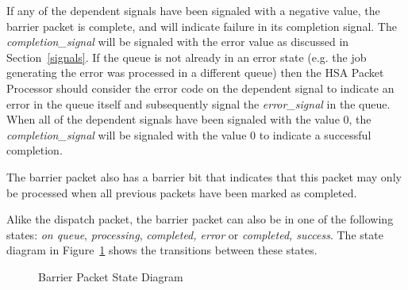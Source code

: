 \documentclass[draft]{book}
\newcommand{\reffld}[1]{\textit{#1}}
\begin{document}
If any of the dependent signals have been signaled with a negative value, the
barrier packet is complete, and will indicate failure in its completion
signal. The \reffld{completion_signal} will be signaled with the error value as
discussed in Section~\ref{signals}. If the queue is not already in an error
state (e.g. the job generating the error was processed in a different queue)
then the HSA Packet Processor should consider the error code on the dependent
signal to indicate an error in the queue itself and subsequently signal the
\reffld{error_signal} in the queue. When all of the dependent signals have been
signaled with the value 0, the \reffld{completion_signal} will be signaled with
the value 0 to indicate a successful completion.

The barrier packet also has a barrier bit that indicates that this packet may
only be processed when all previous packets have been marked as completed.

Alike the dispatch packet, the barrier packet can also be in one of the
following states: \emph{on queue}, \emph{processing}, \emph{completed, error} or
\emph{completed, success}. The state diagram in
Figure~\ref{fig:barrierpacketstate} shows the transitions between these states.

\begin{figure}
  \centering
  \scriptsize
    \caption{Barrier Packet State Diagram}
  \label{fig:barrierpacketstate}
\end{figure}
\end{document}
